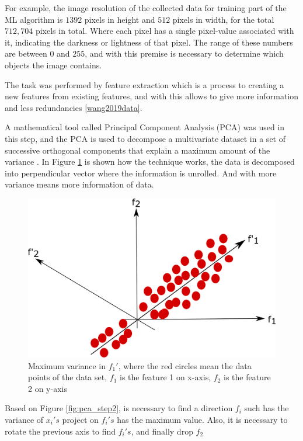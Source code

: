 For example, the image resolution of the collected data for training part of the ML algorithm is $1392$ pixels in height and $512$ pixels in width, for the total $712,704$ pixels in total. Where each pixel has a single pixel-value associated with it, indicating the darkness or lightness of that pixel. The range of these numbers are between $0$ and $255$, and with this premise is necessary to determine which objects the image contains.

The task was performed by feature extraction which is a process to creating a new features from existing features, and with this allows to give more information and less redundancies \ref{wang2019data}.

A mathematical tool called Principal Component Analysis (PCA) was used in this step, and the PCA is used to decompose a multivariate dataset in a set of successive orthogonal components that explain a maximum amount of the variance \cite{pedregosa2011scikit}. In Figure \ref{fig:pca_step1} is shown how the technique works, the data is decomposed into perpendicular vector where the information is unrolled. And with more variance means more information of data.

\begin{figure}[H]
\centering
\includegraphics[scale=0.7]{imagens/pca1.png}
\caption{Maximum variance in $f_1'$, where the red circles mean the data points of the data set, $f_1$ is the feature 1 on x-axis, $f_2$ is the feature 2 on y-axis}
\label{fig:pca_step1}
\end{figure}


Based on Figure \ref{fig:pca_step2}, is necessary to find a direction $f_i$ such has the variance of $x_i's$ project on $f_i's$ has the maximum value. Also, it is necessary to rotate the previous axis to find $f_i's$, and finally drop $f_2$

